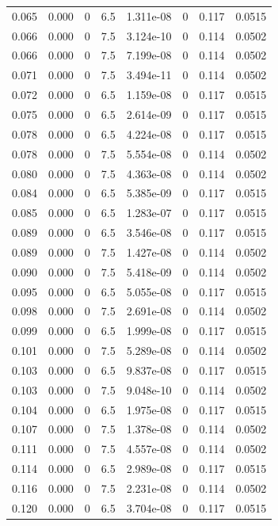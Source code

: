 \documentclass[preview]{standalone}
\begin{document}
{{\begin{tabular}{L{1.2cm}C{1.2cm} C{0.3cm}C{0.5cm} C{1.4cm}C{1.4cm} C{1.4cm}C{1.4cm}}
  0.065  &  0.000  & 0     & 6.5 &  1.311e-08  & 0  & 0.117 &  0.0515   \\ 
  0.066  &  0.000  & 0     & 7.5 &  3.124e-10  & 0  & 0.114 &  0.0502   \\ 
  0.066  &  0.000  & 0     & 7.5 &  7.199e-08  & 0  & 0.114 &  0.0502   \\ 
  0.071  &  0.000  & 0     & 7.5 &  3.494e-11  & 0  & 0.114 &  0.0502   \\ 
  0.072  &  0.000  & 0     & 6.5 &  1.159e-08  & 0  & 0.117 &  0.0515   \\ 
  0.075  &  0.000  & 0     & 6.5 &  2.614e-09  & 0  & 0.117 &  0.0515   \\ 
  0.078  &  0.000  & 0     & 6.5 &  4.224e-08  & 0  & 0.117 &  0.0515   \\ 
  0.078  &  0.000  & 0     & 7.5 &  5.554e-08  & 0  & 0.114 &  0.0502   \\ 
  0.080  &  0.000  & 0     & 7.5 &  4.363e-08  & 0  & 0.114 &  0.0502   \\ 
  0.084  &  0.000  & 0     & 6.5 &  5.385e-09  & 0  & 0.117 &  0.0515   \\ 
  0.085  &  0.000  & 0     & 6.5 &  1.283e-07  & 0  & 0.117 &  0.0515   \\ 
  0.089  &  0.000  & 0     & 6.5 &  3.546e-08  & 0  & 0.117 &  0.0515   \\ 
  0.089  &  0.000  & 0     & 7.5 &  1.427e-08  & 0  & 0.114 &  0.0502   \\ 
  0.090  &  0.000  & 0     & 7.5 &  5.418e-09  & 0  & 0.114 &  0.0502   \\ 
  0.095  &  0.000  & 0     & 6.5 &  5.055e-08  & 0  & 0.117 &  0.0515   \\ 
  0.098  &  0.000  & 0     & 7.5 &  2.691e-08  & 0  & 0.114 &  0.0502   \\ 
  0.099  &  0.000  & 0     & 6.5 &  1.999e-08  & 0  & 0.117 &  0.0515   \\ 
  0.101  &  0.000  & 0     & 7.5 &  5.289e-08  & 0  & 0.114 &  0.0502   \\ 
  0.103  &  0.000  & 0     & 6.5 &  9.837e-08  & 0  & 0.117 &  0.0515   \\ 
  0.103  &  0.000  & 0     & 7.5 &  9.048e-10  & 0  & 0.114 &  0.0502   \\ 
  0.104  &  0.000  & 0     & 6.5 &  1.975e-08  & 0  & 0.117 &  0.0515   \\ 
  0.107  &  0.000  & 0     & 7.5 &  1.378e-08  & 0  & 0.114 &  0.0502   \\ 
  0.111  &  0.000  & 0     & 7.5 &  4.557e-08  & 0  & 0.114 &  0.0502   \\ 
  0.114  &  0.000  & 0     & 6.5 &  2.989e-08  & 0  & 0.117 &  0.0515   \\ 
  0.116  &  0.000  & 0     & 7.5 &  2.231e-08  & 0  & 0.114 &  0.0502   \\ 
  0.120  &  0.000  & 0     & 6.5 &  3.704e-08  & 0  & 0.117 &  0.0515   \\ 
\hline 
\end{tabular} 

}}
\end{document}
